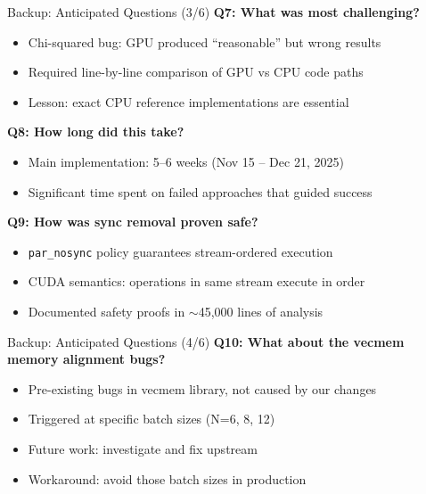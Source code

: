 \documentclass[aspectratio=169, table]{beamer}
\begin{document}
\begin{frame}{Backup: Anticipated Questions (3/6)}
\textbf{Q7: What was most challenging?}
\begin{itemize}
    \item Chi-squared bug: GPU produced ``reasonable'' but wrong results
    \item Required line-by-line comparison of GPU vs CPU code paths
    \item Lesson: exact CPU reference implementations are essential
\end{itemize}

\vspace{0.5em}
\textbf{Q8: How long did this take?}
\begin{itemize}
    \item Main implementation: 5--6 weeks (Nov 15 -- Dec 21, 2025)
    \item Significant time spent on failed approaches that guided success
\end{itemize}

\vspace{0.5em}
\textbf{Q9: How was sync removal proven safe?}
\begin{itemize}
    \item \texttt{par\_nosync} policy guarantees stream-ordered execution
    \item CUDA semantics: operations in same stream execute in order
    \item Documented safety proofs in $\sim$45,000 lines of analysis
\end{itemize}
\end{frame}

\begin{frame}{Backup: Anticipated Questions (4/6)}
\textbf{Q10: What about the vecmem memory alignment bugs?}
\begin{itemize}
    \item Pre-existing bugs in vecmem library, not caused by our changes
    \item Triggered at specific batch sizes (N=6, 8, 12)
    \item Future work: investigate and fix upstream
    \item Workaround: avoid those batch sizes in production
\end{itemize}
\end{frame}
\end{document}
